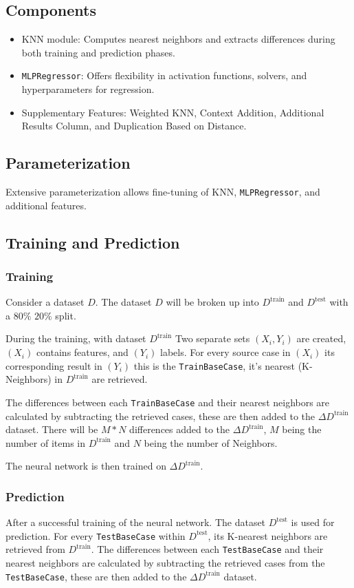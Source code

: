 \documentclass[a4paper, 12pt]{report}
\begin{document}
\subsection{Components}
\begin{itemize}
    \item KNN module: Computes nearest neighbors and extracts differences during both training and prediction phases.
    \item \texttt{MLPRegressor}: Offers flexibility in activation functions, solvers, and hyperparameters for regression.
    \item Supplementary Features: Weighted KNN, Context Addition, Additional Results Column, and Duplication Based on Distance.
\end{itemize}

\subsection{Parameterization}
Extensive parameterization allows fine-tuning of KNN, \texttt{MLPRegressor}, and additional features.

\subsection{Training and Prediction}
\subsubsection{Training}
Consider a dataset $D$. The dataset $D$ will be broken up into $D^{\text{train}}$ and $D^{\text{test}}$ with a $80\%$ $20\%$ split.

During the training, with dataset $D^{\text{train}}$
Two separate sets $(X_i, Y_i)$ are created, $(X_i)$ contains features, and $(Y_i)$ labels.
For every source case in $(X_i)$ its corresponding result in $(Y_i)$ this is the \texttt{TrainBaseCase}, it's nearest (K-Neighbors) in $D^{\text{train}}$ are retrieved.

The differences between each \texttt{TrainBaseCase} and their nearest neighbors are calculated by subtracting the retrieved cases, these are then added to the $\Delta D^{\text{train}}$ dataset.
There will be $M*N$ differences added to the $\Delta D^{\text{train}}$, $M$ being the number of items in $D^{\text{train}}$ and $N$ being the number of Neighbors.

The neural network is then trained on $\Delta D^{\text{train}}$.
\subsubsection{Prediction}
After a successful training of the neural network.
The dataset $D^{\text{test}}$ is used for prediction.
For every \texttt{TestBaseCase} within $D^{\text{test}}$, its K-nearest neighbors are retrieved from $D^{\text{train}}$. 
The differences between each \texttt{TestBaseCase} and their nearest neighbors are calculated by subtracting the retrieved cases from the \texttt{TestBaseCase}, 
these are then added to the $\Delta D^{\text{train}}$ dataset.
\end{document}
